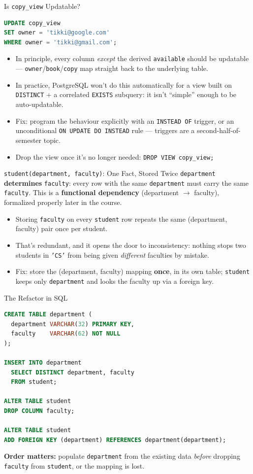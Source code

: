 \documentclass{beamer}
\begin{document}
\begin{frame}[fragile]{Is \texttt{copy\_view} Updatable?}
\small
\begin{lstlisting}[language=SQL]
UPDATE copy_view
SET owner = 'tikki@google.com'
WHERE owner = 'tikki@gmail.com';
\end{lstlisting}
\begin{itemize}
  \item In principle, every column \emph{except} the derived \texttt{available} should be updatable --- \texttt{owner}/\texttt{book}/\texttt{copy} map straight back to the underlying table.
  \item In practice, PostgreSQL won't do this automatically for a view built on \texttt{DISTINCT} + a correlated \texttt{EXISTS} subquery: it isn't ``simple'' enough to be auto-updatable.
  \item Fix: program the behaviour explicitly with an \texttt{INSTEAD OF} trigger, or an unconditional \texttt{ON UPDATE DO INSTEAD} rule --- triggers are a second-half-of-semester topic.
  \item Drop the view once it's no longer needed: \texttt{DROP VIEW copy\_view;}
\end{itemize}
\end{frame}

\begin{frame}{\texttt{student(department, faculty)}: One Fact, Stored Twice}
\small
\texttt{department} \textbf{determines} \texttt{faculty}: every row with the same \texttt{department} must carry the same \texttt{faculty}. This is a \textbf{functional dependency} (department $\to$ faculty), formalized properly later in the course.
\begin{itemize}
  \item Storing \texttt{faculty} on every \texttt{student} row repeats the same (department, faculty) pair once per student.
  \item That's redundant, and it opens the door to inconsistency: nothing stops two students in \texttt{'CS'} from being given \emph{different} faculties by mistake.
  \item Fix: store the (department, faculty) mapping \textbf{once}, in its own table; \texttt{student} keeps only \texttt{department} and looks the faculty up via a foreign key.
\end{itemize}
\end{frame}

\begin{frame}[fragile]{The Refactor in SQL}
\begin{lstlisting}[language=SQL]
CREATE TABLE department (
  department VARCHAR(32) PRIMARY KEY,
  faculty    VARCHAR(62) NOT NULL
);

INSERT INTO department
  SELECT DISTINCT department, faculty
  FROM student;

ALTER TABLE student
DROP COLUMN faculty;

ALTER TABLE student
ADD FOREIGN KEY (department) REFERENCES department(department);
\end{lstlisting}
\small
\textbf{Order matters:} populate \texttt{department} from the existing data \emph{before} dropping \texttt{faculty} from \texttt{student}, or the mapping is lost.
\end{frame}
\end{document}
